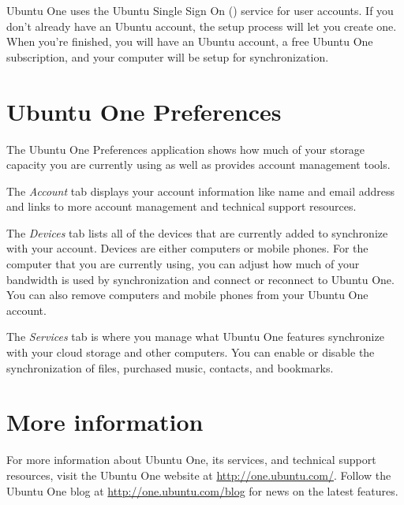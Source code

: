 
Ubuntu One uses the Ubuntu Single Sign On () service for user accounts. If you don't already have an Ubuntu  account, the setup process will let you create one. When you're finished, you will have an Ubuntu  account, a free Ubuntu One subscription, and your computer will be setup for synchronization.

\section{Ubuntu One Preferences}
The Ubuntu One Preferences application shows how much of your storage capacity you are currently using as well as provides account management tools.

The \emph{Account} tab displays your account information like name and email address and links to more account management and technical support resources.

The \emph{Devices} tab lists all of the devices that are currently added to synchronize with your account. Devices are either computers or mobile phones. For the computer that you are currently using, you can adjust how much of your bandwidth is used by synchronization and connect or reconnect to Ubuntu One. You can also remove computers and mobile phones from your Ubuntu One account.

The \emph{Services} tab is where you manage what Ubuntu One features synchronize with your cloud storage and other computers. You can enable or disable the synchronization of files, purchased music, contacts, and bookmarks.

\section{More information}
For more information about Ubuntu One, its services, and technical support resources, visit the Ubuntu One website at \url{http://one.ubuntu.com/}. Follow the Ubuntu One blog at \url{http://one.ubuntu.com/blog} for news on the latest features.
